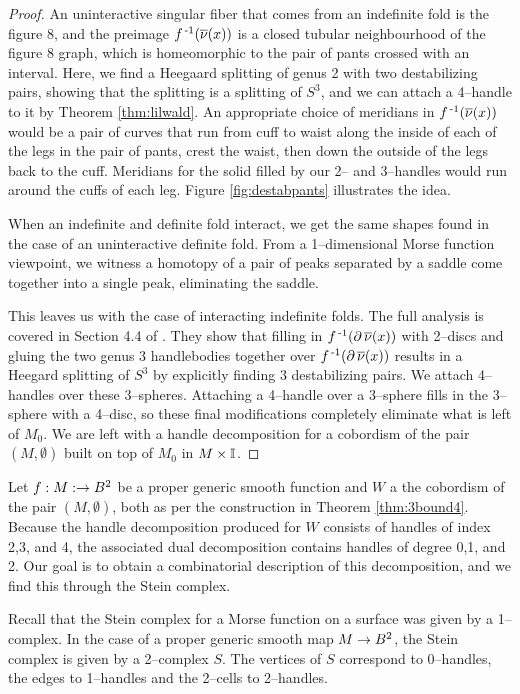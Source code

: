 \begin{proof}
	An uninteractive singular fiber that comes from an indefinite fold is the figure 8, and the preimage $f^{\,\text{-}1}(\overline{\nu}(x))$ is a closed tubular neighbourhood of the figure 8 graph, which is homeomorphic to the pair of pants crossed with an interval.
	Here, we find a Heegaard splitting of genus 2 with two destabilizing pairs, showing that the splitting is a splitting of $S^3$, and we can attach a 4--handle to it by Theorem \ref{thm:lilwald}.
	An appropriate choice of meridians in $f^{\,\text{-}1}(\overline{\nu}(x))$ would be a pair of curves that run from cuff to waist along the inside of each of the legs in the pair of pants, crest the waist, then down the outside of the legs back to the cuff.
	Meridians for the solid filled by our 2-- and 3--handles would run around the cuffs of each leg.
	Figure \ref{fig:destabpants} illustrates the idea.
	
	When an indefinite and definite fold interact, we get the same shapes found in the case of an uninteractive definite fold.
	From a 1--dimensional Morse function viewpoint, we witness a homotopy of a pair of peaks separated by a saddle come together into a single peak, eliminating the saddle.
		
	This leaves us with the case of interacting indefinite folds.
	The full analysis is covered in Section 4.4 of \cite{CostThur08}.
	They show that filling in $f^{\,\text{-}1}(\partial\,\overline{\nu}(x))$ with 2--discs and gluing the two genus 3 handlebodies together over $f^{\,\text{-}1}(\partial\,\overline{\nu}(x))$ results in a Heegard splitting of $S^3$ by explicitly finding 3 destabilizing pairs.
	We attach 4--handles over these 3--spheres.
	Attaching a 4--handle over a 3--sphere fills in the 3--sphere with a 4--disc, so these final modifications completely eliminate what is left of $M_0$.
	We are left with a handle decomposition for a cobordism of the pair $(M,\emptyset)$ built on top of $M_0$ in $M\times\mathbb{I}$.
\end{proof}

Let $f:M:\to B^2$ be a proper generic smooth function and $W$ a the cobordism of the pair $(M,\emptyset)$, both as per the construction in Theorem \ref{thm:3bound4}. 
Because the handle decomposition produced for $W$ consists of handles of index 2,3, and 4, the associated dual decomposition contains handles of degree 0,1, and 2.
Our goal is to obtain a combinatorial description of this decomposition, and we find this through the Stein complex.

Recall that the Stein complex for a Morse function on a surface was given by a 1--complex.
In the case of a proper generic smooth map $M\to B^2$, the Stein complex is given by a 2--complex $S$.
The vertices of $S$ correspond to 0--handles, the edges to 1--handles and the 2--cells to 2--handles.

